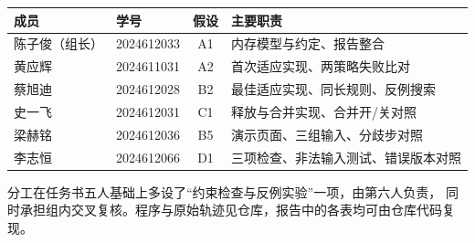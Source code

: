\documentclass[12pt,a4paper]{ctexart}
\begin{document}
\begin{table}[htbp]
    \centering
    \small
    \setlength{\tabcolsep}{4pt}
    \begin{tabularx}{\textwidth}{@{}llc>{\raggedright\arraybackslash}X@{}}
        \toprule
        成员 & 学号 & 假设 & 主要职责 \\
        \midrule
        陈子俊（组长） & 2024612033 & A1 & 内存模型与约定、报告整合 \\
        黄应辉 & 2024611031 & A2 & 首次适应实现、两策略失败比对 \\
        蔡旭迪 & 2024612028 & B2 & 最佳适应实现、同长规则、反例搜索 \\
        史一飞 & 2024612031 & C1 & 释放与合并实现、合并开/关对照 \\
        梁赫铭 & 2024612036 & B5 & 演示页面、三组输入、分歧步对照 \\
        李志恒 & 2024612066 & D1 & 三项检查、非法输入测试、错误版本对照 \\
        \bottomrule
    \end{tabularx}
\end{table}

分工在任务书五人基础上多设了“约束检查与反例实验”一项，由第六人负责，
同时承担组内交叉复核。程序与原始轨迹见仓库，报告中的各表均可由仓库代码复现。
\end{document}
